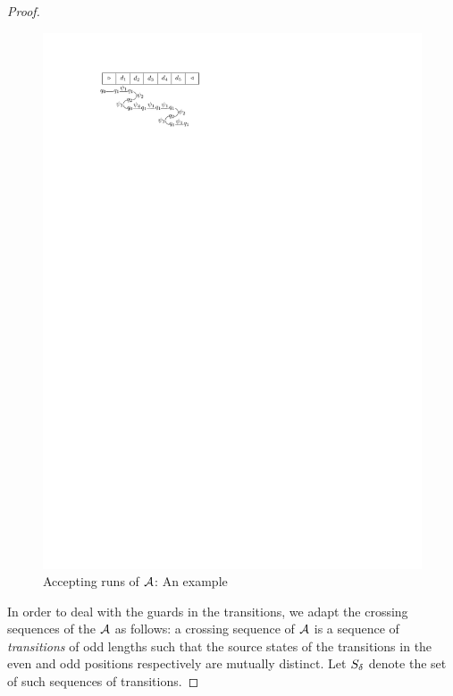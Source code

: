 \begin{proof}
\begin{figure}[htbp]
\begin{center}
\includegraphics{2sa-sa-exmp.pdf}
\end{center}
\caption{Accepting runs of $\mathcal{A}$: An example}\label{fig-2sa-sa}
\end{figure}

In order to deal with the guards in the transitions, we adapt the crossing sequences of the \SSA{} $\mathcal{A}$  as follows: a crossing sequence of $\mathcal{A}$ is a sequence of \emph{transitions} of odd lengths such that  the source states of the transitions in the even and odd  positions respectively are mutually distinct. Let $S_{\delta}$ denote the set of such sequences of transitions. 



\end{proof}
